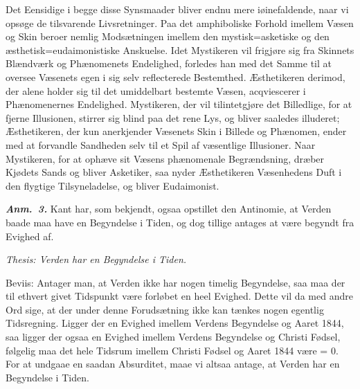 \documentclass[12pt]{book}
\newcommand{\anm}[1]{\emph{\textbf{Anm.~#1.}}}
\newcommand{\opage}[1]{\marginnote{\footnotesize\textit{[#1]}}}
\begin{document}
Det Eensidige i begge disse Synsmaader bliver endnu mere iøinefaldende, naar vi
opsøge de tilsvarende Livsretninger. Paa det amphiboliske Forhold imellem Væsen og
Skin beroer nemlig Modsætningen imellem den mystisk=asketiske og den
æsthetisk=eudaimonistiske Anskuelse. Idet Mystikeren vil
\opage{122} %
frigjøre sig fra Skinnets Blændværk og Phænomenets Endelighed, forledes han med det
Samme til at oversee Væsenets egen i sig selv reflecterede Bestemthed. Æsthetikeren
derimod, der alene holder sig til det umiddelbart bestemte Væsen, acqviescerer i
Phænomenernes Endelighed. Mystikeren, der vil tilintetgjøre det Billedlige, for at
fjerne Illusionen, stirrer sig blind paa det rene Lys, og bliver saaledes illuderet;
Æsthetikeren, der kun anerkjender Væsenets Skin i Billede og Phænomen, ender med at
forvandle Sandheden selv til et Spil af væsentlige Illusioner. Naar Mystikeren, for
at ophæve sit Væsens phænomenale Begrændsning, dræber Kjødets Sands og bliver
Asketiker, saa nyder Æsthetikeren Væsenhedens Duft i den flygtige Tilsyneladelse, og
bliver Eudaimonist.

\anm{3} Kant har, som bekjendt, ogsaa opstillet den Antinomie, at Verden baade maa
have en Begyndelse i Tiden, og dog tillige antages at være begyndt fra Evighed af.

\emph{Thesis: Verden har en Begyndelse i Tiden.}

Beviis: Antager man, at Verden ikke har nogen timelig Begyndelse, saa maa der til
ethvert givet Tidspunkt være forløbet en heel Evighed. Dette vil da med andre Ord
sige, at der under denne Forudsætning ikke kan tænkes nogen egentlig Tidsregning.
Ligger der en Evighed imellem Verdens Begyndelse og Aaret 1844, saa ligger der ogsaa
en Evighed imellem Verdens Begyndelse og Christi Fødsel, følgelig maa det hele
Tidsrum imellem Christi Fødsel og Aaret 1844 være = 0. For at undgaae en saadan
Absurditet, maae vi altsaa antage, at Verden har en Begyndelse i Tiden.
\end{document}

